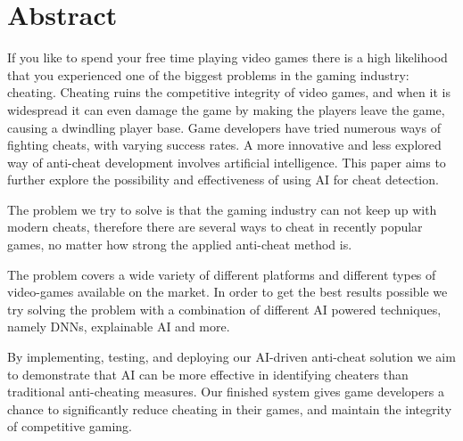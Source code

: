 \section{Abstract}
\label{ch:abstract}

If you like to spend your free time playing video games there is a high likelihood that you
experienced one of the biggest problems in the gaming industry: cheating. Cheating ruins the
competitive integrity of video games, and when it is widespread it can even damage the game by
making the players leave the game, causing a dwindling player base. Game developers have
tried numerous ways of fighting cheats, with varying success rates. A more innovative and less
explored way of anti-cheat development involves artificial intelligence. This paper aims to further explore the possibility
and effectiveness of using AI for cheat detection.

The problem we try to solve is that the gaming industry can not keep up with modern cheats, therefore there are several ways to cheat in recently popular games, no matter how strong the applied anti-cheat method is.

The problem covers a wide variety of different platforms and different types of video-games available on the market.
In order to get the best results possible we try solving the problem with a combination of different AI powered techniques, namely DNNs, explainable AI and more.

By implementing, testing, and deploying our AI-driven anti-cheat solution we aim to
demonstrate that AI can be more effective in identifying cheaters than traditional anti-cheating
measures. Our finished system gives game developers a chance to significantly reduce cheating
in their games, and maintain the integrity of competitive gaming.
